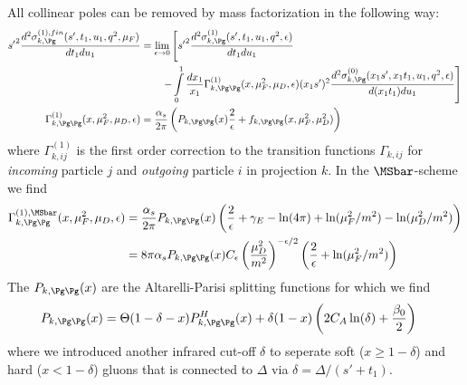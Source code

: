 All collinear poles can be removed by mass factorization in the following way:
\begin{align}
{s'}^2\frac{d^2\sigma_{k,\Pg}^{(1),fin}(s',t_1,u_1,q^2,\mu_F)}{dt_1du_1} &= \lim_{\epsilon\rightarrow 0}\left[{s'}^2\frac{d^2\sigma_{k,\Pg}^{(1)}(s',t_1,u_1,q^2,\epsilon)}{dt_1du_1} \right.\nonumber\\
 &\hspace{20pt}\left. -\int\limits_0^1\frac{dx_1}{x_1}\Gamma_{k,\Pg\Pg}^{(1)}(x,\mu_F^2,\mu_D,\epsilon)(x_1s')^2\frac{d^2\sigma_{k,\Pg}^{(0)}(x_1s',x_1t_1,u_1,q^2,\epsilon)}{d(x_1t_1)du_1} \right]\\
\Gamma_{k,\Pg\Pg}^{(1)}(x,\mu_F^2,\mu_D,\epsilon) &= \frac{\alpha_s}{2\pi}\left(P_{k,\Pg\Pg}(x)\frac{2}{\epsilon} + f_{k,\Pg\Pg}(x,\mu_F^2,\mu_D^2)\right)
\end{align}
where $\Gamma_{k,ij}^{(1)}$ is the first order correction to the transition functions $\Gamma_{k,ij}$ for \textit{incoming} particle $j$ and \textit{outgoing} particle $i$ in projection $k$. In the $\MSbar$-scheme we find
\begin{align}
\Gamma_{k,\Pg\Pg}^{(1),\MSbar}(x,\mu_F^2,\mu_D,\epsilon) &= \frac{\alpha_s}{2\pi}P_{k,\Pg\Pg}(x)\left(\frac{2}{\epsilon} +\gamma_E - \ln(4\pi) + \ln(\mu_F^2/m^2) - \ln(\mu_D^2/m^2)\right)\\
 &= 8\pi\alpha_s P_{k,\Pg\Pg}(x) C_\epsilon \left(\frac{\mu_D^2}{m^2}\right)^{-\epsilon/2} \left(\frac{2}{\epsilon} + \ln(\mu_F^2/m^2)\right)
\end{align}
The $P_{k,\Pg\Pg}(x)$ are the Altarelli-Parisi splitting functions for which we find\cite{Altarelli:1977zs,Vogelsang:1995vh}
\begin{align}
P_{k,\Pg\Pg}(x) &= \Theta(1-\delta-x)P_{k,\Pg\Pg}^H(x)+\delta(1-x)\left(2C_A\ln(\delta)+\frac{\beta_0}{2}\right)
\end{align}
where we introduced another infrared cut-off $\delta$ to seperate soft ($x\geq 1-\delta$) and hard ($x<1-\delta$) gluons that is connected to $\Delta$ via $\delta=\Delta/(s'+t_1)$.
